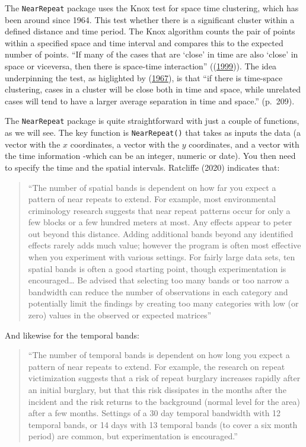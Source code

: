 \documentclass[
  krantz2]{krantz}
\begin{document}
The \texttt{NearRepeat} package uses the Knox test for space time clustering, which has been around since 1964. This test whether there is a significant cluster within a defined distance and time period. The Knox algorithm counts the pair of points within a specified space and time interval and compares this to the expected number of points. ``If many of the cases that are `close' in time are also `close' in space or viceversa, then there is space-time interaction'' ((\protect\hyperlink{ref-Kulldorff_1999}{1999})). The idea underpinning the test, as higlighted by (\protect\hyperlink{ref-Mantel_1967}{1967}), is that ``if there is time-space clustering, cases in a cluster will be close both in time and space, while unrelated cases will tend to have a larger average separation in time and space.'' (p.~209).

The \texttt{NearRepeat} package is quite straightforward with just a couple of functions, as we will see. The key function is \texttt{NearRepeat()} that takes as inputs the data (a vector with the \(x\) coordinates, a vector with the \(y\) coordinates, and a vector with the time information -which can be an integer, numeric or date). You then need to specify the time and the spatial intervals. Ratcliffe (2020) indicates that:

\begin{quote}
``The number of spatial bands is dependent on how far you expect a pattern of near repeats to extend. For example, most environmental criminology research suggests that near repeat patterns occur for only a few blocks or a few hundred meters at most. Any effects appear to peter out beyond this distance. Adding additional bands beyond any identified effects rarely adds much value; however the program is often most effective when you experiment with various settings. For fairly large data sets, ten spatial bands is often a good starting point, though experimentation is encouraged\ldots{} Be advised that selecting too many bands or too narrow a bandwidth can reduce the number of observations in each category and potentially limit the findings by creating too many categories with low (or zero) values in the observed or expected matrices''
\end{quote}

And likewise for the temporal bands:

\begin{quote}
``The number of temporal bands is dependent on how long you expect a pattern of near repeats to extend. For example, the research on repeat victimization suggests that a risk of repeat burglary increases rapidly after an initial burglary, but that this risk dissipates in the months after the incident and the risk returns to the background (normal level for the area) after a few months. Settings of a 30 day temporal bandwidth with 12 temporal bands, or 14 days with 13 temporal bands (to cover a six month period) are common, but experimentation is encouraged.''
\end{quote}
\end{document}
